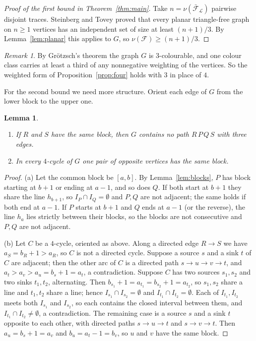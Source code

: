 \documentclass[11pt]{article}
\newtheorem{lemma}[theorem]{Lemma}
\theoremstyle{remark}
\newtheorem{remark}[theorem]{Remark}
\newcommand{\F}{\mathcal{F}}
\newcommand{\Fb}{\bar{\mathcal{F}}}
\newcommand{\cL}{\mathcal{L}}
\begin{document}
\begin{proof}[Proof of the first bound in Theorem~\ref{thm:main}]
Take $n=\nu(\Fb_\cL)$ pairwise disjoint traces. Steinberg and Tovey \cite{ST} proved that every planar triangle-free graph on $n\ge1$ vertices has an independent set of size at least $(n+1)/3$. By Lemma~\ref{lem:planar} this applies to $G$, so $\nu(\F)\ge(n+1)/3$.
\end{proof}

\begin{remark}\label{rem:weights}
By Gr\"otzsch's theorem \cite{G} the graph $G$ is $3$-colourable, and one colour class carries at least a third of any nonnegative weighting of the vertices. So the weighted form of Proposition~\ref{prop:four} holds with $3$ in place of $4$.
\end{remark}

For the second bound we need more structure. Orient each edge of $G$ from the lower block to the upper one.

\begin{lemma}\label{lem:cycles}
\begin{enumerate}
\item[(a)] If $R$ and $S$ have the same block, then $G$ contains no path $R\,P\,Q\,S$ with three edges.
\item[(b)] In every $4$-cycle of $G$ one pair of opposite vertices has the same block.
\end{enumerate}
\end{lemma}

\begin{proof}
(a) Let the common block be $[a,b]$. By Lemma~\ref{lem:blocks}, $P$ has block starting at $b+1$ or ending at $a-1$, and so does $Q$. If both start at $b+1$ they share the line $h_{b+1}$, so $I_P\cap I_Q=\emptyset$ and $P,Q$ are not adjacent; the same holds if both end at $a-1$. If $P$ starts at $b+1$ and $Q$ ends at $a-1$ (or the reverse), the line $h_a$ lies strictly between their blocks, so the blocks are not consecutive and $P,Q$ are not adjacent.

(b) Let $C$ be a $4$-cycle, oriented as above. Along a directed edge $R\to S$ we have $a_S=b_R+1>a_R$, so $C$ is not a directed cycle. Suppose a source $s$ and a sink $t$ of $C$ are adjacent; then the other arc of $C$ is a directed path $s\to u\to v\to t$, and $a_t>a_v>a_u=b_s+1=a_t$, a contradiction. Suppose $C$ has two sources $s_1,s_2$ and two sinks $t_1,t_2$, alternating. Then $b_{s_1}+1=a_{t_1}=b_{s_2}+1=a_{t_2}$, so $s_1,s_2$ share a line and $t_1,t_2$ share a line; hence $I_{s_1}\cap I_{s_2}=\emptyset$ and $I_{t_1}\cap I_{t_2}=\emptyset$. Each of $I_{t_1},I_{t_2}$ meets both $I_{s_1}$ and $I_{s_2}$, so each contains the closed interval between them, and $I_{t_1}\cap I_{t_2}\ne\emptyset$, a contradiction. The remaining case is a source $s$ and a sink $t$ opposite to each other, with directed paths $s\to u\to t$ and $s\to v\to t$. Then $a_u=b_s+1=a_v$ and $b_u=a_t-1=b_v$, so $u$ and $v$ have the same block.
\end{proof}
\end{document}
